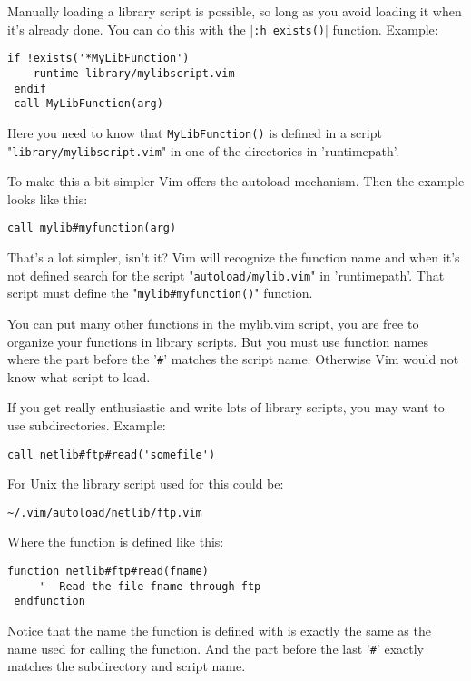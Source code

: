 Manually loading a library script is possible, so long as you avoid loading it when it's already done.
You can do this with the |\verb!:h exists()!| function.
Example:

\begin{Verbatim}[samepage=true]
 if !exists('*MyLibFunction')
    runtime library/mylibscript.vim
 endif
 call MyLibFunction(arg)
\end{Verbatim}

Here you need to know that \verb!MyLibFunction()! is defined in a script "\verb!library/mylibscript.vim!" in one of the directories in 'runtimepath'.

To make this a bit simpler Vim offers the autoload mechanism.
Then the example looks like this:

\begin{Verbatim}[samepage=true]
 call mylib#myfunction(arg)
\end{Verbatim}

That's a lot simpler, isn't it?
Vim will recognize the function name and when it's not defined search for the script "\verb!autoload/mylib.vim!" in 'runtimepath'.
That script must define the "\verb!mylib#myfunction()!" function.

You can put many other functions in the mylib.vim script, you are free to organize your functions in library scripts.
But you must use function names where the part before the '\verb!#!' matches the script name.
Otherwise Vim would not know what script to load.

If you get really enthusiastic and write lots of library scripts, you may want to use subdirectories.
Example:

\begin{Verbatim}[samepage=true]
 call netlib#ftp#read('somefile')
\end{Verbatim}

For Unix the library script used for this could be:

\begin{Verbatim}[samepage=true]
    ~/.vim/autoload/netlib/ftp.vim
\end{Verbatim}

Where the function is defined like this:

\begin{Verbatim}[samepage=true]
 function netlib#ftp#read(fname)
     "  Read the file fname through ftp
 endfunction
\end{Verbatim}

Notice that the name the function is defined with is exactly the same as the name used for calling the function.
And the part before the last '\verb!#!' exactly matches the subdirectory and script name.

